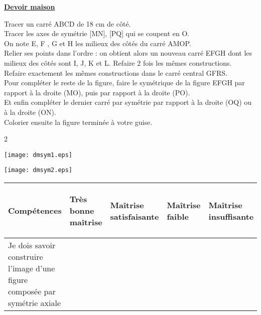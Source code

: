 \documentclass[a4paper,11pt]{article}
\newcommand{\bmul}[1]{\begin{multicols}{#1}}
\newcommand{\emul}{\end{multicols}}
\begin{document}
\pagestyle{empty}


\begin{landscape}

\begin{center}
\textbf{{\Large \underline{Devoir maison}}}
\end{center}

\vspace*{0.5cm}

\noindent Tracer un carré ABCD de 18 cm de côté.\\
Tracer les axes de symétrie [MN], [PQ] qui se coupent en O.\\
On note E, F , G et H les milieux des côtés du carré AMOP.\\
Relier ses points dans l'ordre : on obtient alors un nouveau carré EFGH dont les milieux des côtés sont I, J, K et L. Refaire 2 fois les mêmes  constructions.\\
Refaire exactement les mêmes constructions dans le carré central GFRS.\\
Pour compléter le reste de la figure, faire le symétrique de la figure EFGH par rapport à la droite (MO), puis par rapport à la droite (PO).\\
Et enfin compléter le dernier carré par symétrie par rapport à la droite (OQ) ou à la droite (ON).\\
Colorier ensuite la figure terminée à votre guise.\\

\bmul{2}

\texttt{[image: dmsym1.eps]} 

\columnbreak

\texttt{[image: dmsym2.eps]} 

\emul




\begin{center}
\begin{small}
\begin{tabular}{|m{6cm}|m{2.5cm}|m{2.5cm}|m{2.5cm}|m{2.5cm}|}
\hline 
\textbf{Compétences} & \begin{center}
\textbf{Très bonne maîtrise}
\end{center} & \begin{center}
\textbf{Maîtrise satisfaisante}
\end{center}  & \begin{center}
\textbf{Maîtrise faible}
\end{center} & \begin{center}
\textbf{Maîtrise insuffisante}
\end{center} \\ 
\hline 
Je dois savoir construire l'image d'une figure composée par symétrie axiale  &  &  &  &\\ 
\hline 

\end{tabular} 
\end{small}

\end{center}




\end{landscape}
\end{document}
